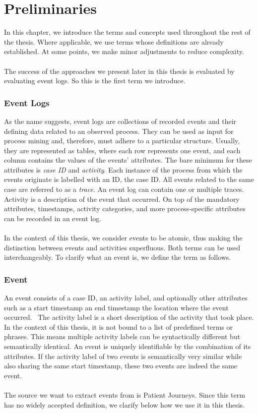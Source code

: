 
\section{Preliminaries}\label{sec:back}
In this chapter, we introduce the terms and concepts used throughout the rest of the thesis. Where applicable, we use terms whose definitions are already established. At some points, we make minor adjustments to reduce complexity.\\\\ 
The success of the approaches we present later in this thesis is evaluated by evaluating event logs. So this is the first term we introduce.
\subsubsection*{Event Logs}\label{sec:event-log}
As the name suggests, event logs are collections of recorded events and their defining data related to an observed process. They can be used as input for process mining and, therefore, must adhere to a particular structure. Usually, they are represented as tables, where each row represents one event, and each column contains the values of the events' attributes. The bare minimum for these attributes is \emph{case ID} and \emph{activity}. Each instance of the process from which the events originate is labelled with an ID, the case ID. All events related to the same case are referred to as a \emph{trace}.  An event log can contain one or multiple traces. Activity is a description of the event that occurred. On top of the mandatory attributes, timestamps, activity categories, and more process-specific attributes can be recorded in an event log.~\cite{van_der_aalst_process_2016}\\\\
In the context of this thesis, we consider events to be atomic, thus making the distinction between events and activities superfluous. Both terms can be used interchangeably. To clarify what an event is, we define the term as follows.

\subsubsection*{Event}\label{sec:event}
An event consists of a case ID, an activity label, and optionally other attributes such as a start timestamp an end timestamp the location where the event occurred.~\cite{van_der_aalst_process_2016} The activity label is a short description of the activity that took place. In the context of this thesis, it is not bound to a list of predefined terms or phrases. This means multiple activity labels can be syntactically different but semantically identical. An event is uniquely identifiable by the combination of its attributes. If the activity label of two events is semantically very similar while also sharing the same start timestamp, these two events are indeed the same event.\\\\
The source we want to extract events from is Patient Journeys. Since this term has no widely accepted definition, we clarify below how we use it in this thesis.

